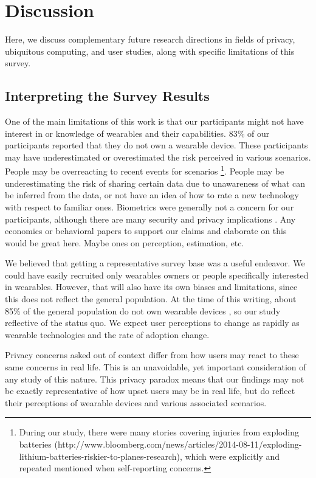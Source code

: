 \section{Discussion}
Here, we discuss complementary future research directions in fields of privacy, ubiquitous computing, and user studies, along with specific limitations of this survey.

\subsection{Interpreting the Survey Results}
One of the main limitations of this work is that our participants might not have interest in or knowledge of wearables and their capabilities. 83\% of our participants reported that they do not own a wearable device. These participants may have underestimated or overestimated the risk perceived in various scenarios. People may be overreacting to recent events for scenarios \footnote{During our study, there were many stories covering injuries from exploding batteries (http://www.bloomberg.com/news/articles/2014-08-11/exploding-lithium-batteries-riskier-to-planes-research), which were explicitly and repeated mentioned when self-reporting concerns.}. People may be underestimating the risk of sharing certain data due to unawareness of what can be inferred from the data, or not have an idea of how to rate a new technology with respect to familiar ones. Biometrics were generally not a concern for our participants, although there are many security and privacy implications \cite{prabhakar2003biometric}. {\color {red} Any economics or behavioral papers to support our claims and elaborate on this would be great here. Maybe ones on perception, estimation, etc.}

We believed that getting a representative survey base was a useful endeavor. We could have easily recruited only wearables owners or people specifically interested in wearables. However, that will also have its own biases and limitations, since this does not reflect the general population. At the time of this writing, about 85\% of the general population do not own wearable devices \cite{Nilsen,WearableStatNews}, so our study reflective of the status quo. We expect user perceptions to change as rapidly as wearable technologies and the rate of adoption change. 

Privacy concerns asked out of context differ from how users may react to these same concerns in real life. This is an unavoidable, yet important consideration of any study of this nature. This privacy paradox means that our findings may not be exactly representative of how upset users may be in real life, but do reflect their perceptions of wearable devices and various associated scenarios. 

